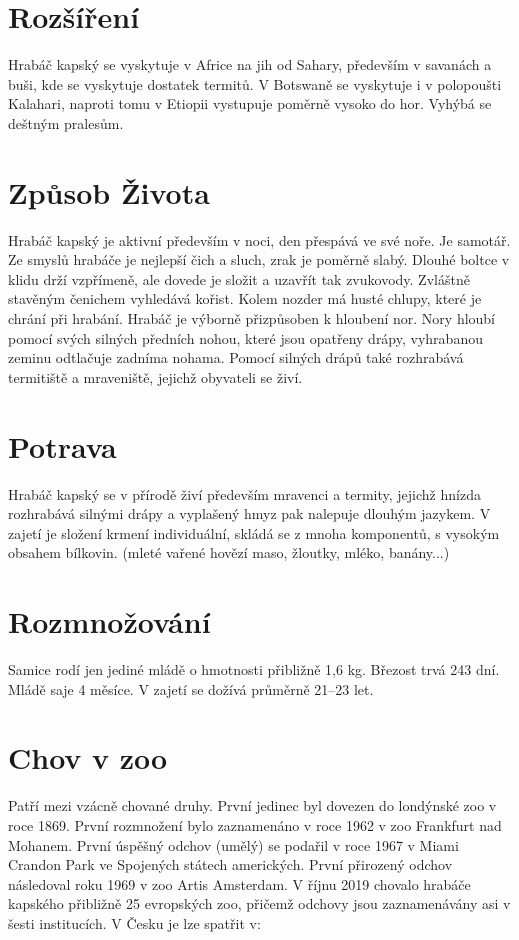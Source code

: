 \documentclass[a4paper, 12pt]{article}
\begin{document}
\section{Rozšíření}

Hrabáč kapský se vyskytuje v Africe na jih od Sahary, především v savanách a buši, kde se vyskytuje dostatek termitů. 
V Botswaně se vyskytuje i v polopoušti Kalahari, naproti tomu v Etiopii vystupuje poměrně vysoko do hor. 
Vyhýbá se deštným pralesům.

\section{Způsob Života}

Hrabáč kapský je aktivní především v noci, den přespává ve své noře. Je samotář. 
Ze smyslů hrabáče je nejlepší čich a sluch, zrak je poměrně slabý. Dlouhé boltce v klidu drží vzpřímeně, 
ale dovede je složit a uzavřít tak zvukovody. Zvláštně stavěným čenichem vyhledává kořist. 
Kolem nozder má husté chlupy, které je chrání při hrabání. Hrabáč je výborně přizpůsoben k hloubení nor. 
Nory hloubí pomocí svých silných předních nohou, které jsou opatřeny drápy, vyhrabanou zeminu odtlačuje zadníma nohama. 
Pomocí silných drápů také rozhrabává termitiště a mraveniště, jejichž obyvateli se živí.

\section{Potrava}

Hrabáč kapský se v přírodě živí především mravenci a termity, jejichž hnízda rozhrabává 
silnými drápy a vyplašený hmyz pak nalepuje dlouhým jazykem. V zajetí je složení krmení individuální, 
skládá se z mnoha komponentů, s vysokým obsahem bílkovin. 
(mleté vařené hovězí maso, žloutky, mléko, banány...)

\section{Rozmnožování}

Samice rodí jen jediné mládě o hmotnosti přibližně 1,6 kg. Březost trvá 243 dní. 
Mládě saje 4 měsíce. V zajetí se dožívá průměrně 21--23 let.

\section{Chov v zoo}

Patří mezi vzácně chované druhy. První jedinec byl dovezen do londýnské zoo v roce 1869. 
První rozmnožení bylo zaznamenáno v roce 1962 v zoo Frankfurt nad Mohanem. 
První úspěšný odchov (umělý) se podařil v roce 1967 v Miami Crandon Park ve Spojených státech amerických. 
První přirozený odchov následoval roku 1969 v zoo Artis Amsterdam. 
V říjnu 2019 chovalo hrabáče kapského přibližně 25 evropských zoo, 
přičemž odchovy jsou zaznamenávány asi v šesti institucích. V Česku je lze spatřit v:
\end{document}
